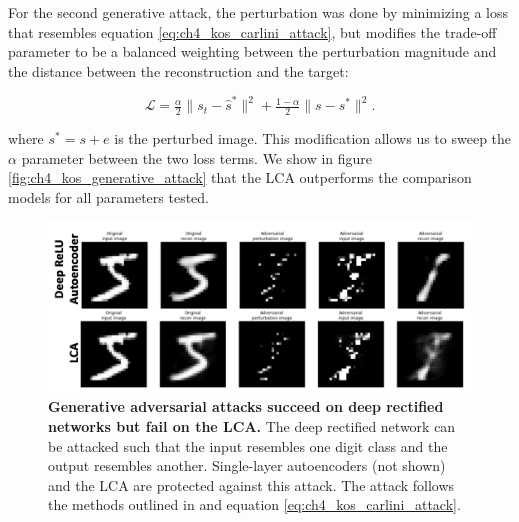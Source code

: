 For the second generative attack, the perturbation was done by minimizing a loss that resembles equation \eqref{eq:ch4_kos_carlini_attack}, but modifies the trade-off parameter to be a balanced weighting between the perturbation magnitude and the distance between the reconstruction and the target:

\begin{equation}\label{eq:ch4_carlini_targeted_recon}
    \mathcal{L} = \tfrac{\alpha}{2} \|s_{t} - \hat{s}^{*}\|^{2} + \tfrac{1-\alpha}{2}\|s - s^{*}\|^{2}.
\end{equation}

\noindent where $s^{*}=s+e$ is the perturbed image. This modification allows us to sweep the $\alpha$ parameter between the two loss terms. We show in figure \ref{fig:ch4_kos_generative_attack} that the LCA outperforms the comparison models for all parameters tested.

\begin{figure}[h]
    \centering
    \includegraphics[width=\textwidth]{figures/adv_carlini_deep_relu_lca.png}
    \caption{\textbf{Generative adversarial attacks succeed on deep rectified networks but fail on the LCA.} The deep rectified network can be attacked such that the input resembles one digit class and the output resembles another. Single-layer autoencoders (not shown) and the LCA are protected against this attack. The attack follows the methods outlined in \parencite{kos2018adversarial} and equation \eqref{eq:ch4_kos_carlini_attack}.}
    \label{fig:ch4_carlini_deep_relu_lca}
\end{figure}



